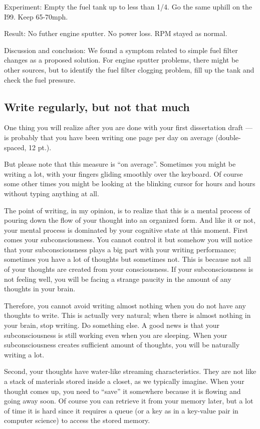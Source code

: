 \documentclass[11pt]{article}
\begin{document}
Experiment: Empty the fuel tank up to less than 1/4. Go the same uphill on the
I99. Keep 65-70mph.

Result: No futher engine sputter. No power loss. RPM stayed as normal.

Discussion and conclusion: We found a symptom related to simple fuel filter
changes as a proposed solution. For engine sputter problems, there might be
other sources, but to identify the fuel filter clogging problem, fill up the
tank and check the fuel pressure.



\subsection{Write regularly, but not that much}
One thing you will realize after you are done with your first dissertation
draft --- is probably that you have been writing one page per day on average
(double-spaced, 12 pt.).

But please note that this measure is ``on average''. Sometimes you might be
writing a lot, with your fingers gliding smoothly over the keyboard.  Of
course some other times you might be looking at the blinking cursor for hours
and hours without typing anything at all. 

The point of writing, in my opinion, is to realize that this is a mental
process of pouring down the flow of your thought into an organized form.  And
like it or not, your mental process is dominated by your cognitive state at
this moment. First comes your subconsciousness. You cannot control it but
somehow you will notice that your subconsciousness plays a big part with your
writing performance; sometimes you have a lot of thoughts but sometimes not.
This is because not all of your thoughts are created from your consciousness.
If your subconsciousness is not feeling well, you will be facing a strange
paucity in the amount of any thoughts in your brain.

Therefore, you cannot avoid writing almost nothing when you do not have any
thoughts to write. This is actually very natural; when there is almost nothing
in your brain, stop writing. Do something else. A good news is that your
subconsciousness is still working even when you are sleeping.  When your
subconsciousness creates sufficient amount of thoughts, you will be naturally
writing a lot. 

Second, your thoughts have water-like streaming characteristics.  They are not
like a stack of materials stored inside a closet, as we typically imagine.
When your thought comes up, you need to ``save'' it somewhere because it is
flowing and going away soon.  Of course you can retrieve it from your memory
later, but a lot of time it is hard since it requires a queue (or a key as in
a key-value pair in computer science) to access the stored memory.
\end{document}
